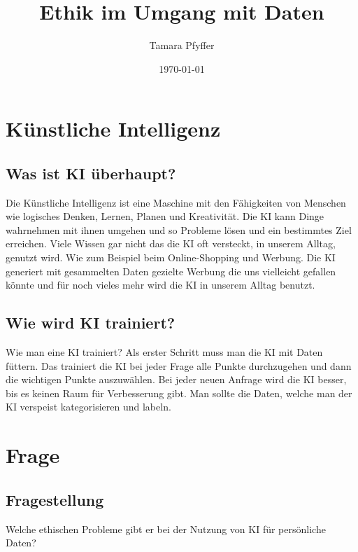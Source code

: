 \documentclass{report}
\title{Ethik im Umgang mit Daten}
\author{Tamara Pfyffer}
\date{\today}
\begin{document}
\maketitle


\tableofcontents

\chapter{Künstliche Intelligenz}

\section{Was ist KI überhaupt?}
Die Künstliche Intelligenz ist eine Maschine mit den Fähigkeiten von Menschen wie logisches Denken, Lernen, Planen und Kreativität. Die KI kann
Dinge wahrnehmen mit ihnen umgehen und so Probleme lösen und ein bestimmtes Ziel erreichen. Viele Wissen gar nicht das die KI oft versteckt,
in unserem Alltag, genutzt wird. Wie zum Beispiel beim Online-Shopping
und Werbung. Die KI generiert mit gesammelten Daten gezielte Werbung
die uns vielleicht gefallen könnte und für noch vieles mehr wird die KI in
unserem Alltag benutzt.

\section{Wie wird KI trainiert?}
Wie man eine KI trainiert? Als erster Schritt muss man die KI mit Daten
füttern. Das trainiert die KI bei jeder Frage alle Punkte durchzugehen und
dann die wichtigen Punkte auszuwählen. Bei jeder neuen Anfrage wird die
KI besser, bis es keinen Raum für Verbesserung gibt. Man sollte die Daten,
welche man der KI verspeist kategorisieren und labeln.

\chapter{Frage}

\section{Fragestellung}
Welche ethischen Probleme gibt er bei der Nutzung von KI für persönliche Daten?
\end{document}
